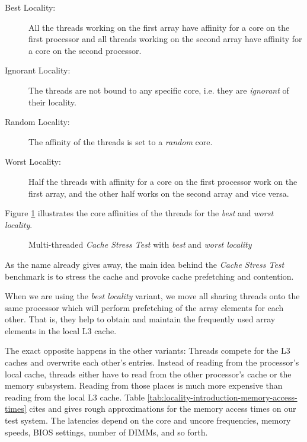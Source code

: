 \begin{description}
\item[Best Locality:] All the threads working on the first array have
  affinity for a core on the first processor and all threads working
  on the second array have affinity for a core on the second
  processor.
\item[Ignorant Locality:] The threads are not bound to any specific
  core, i.e. they are \emph{ignorant} of their locality.
\item[Random Locality:] The affinity of the threads is set to a
  \emph{random} core.
\item[Worst Locality:] Half the threads with affinity for a core on
  the first processor work on the first array, and the other half
  works on the second array and vice versa.
\end{description}

Figure \ref{fig:locality-approach-cache-stress-test-mafushi}
illustrates the core affinities of the threads for the \emph{best} and
\emph{worst locality}.

\begin{figure}[!ht]
  \centering
  \caption{Multi-threaded \emph{Cache Stress Test} with \emph{best}
    and \emph{worst locality}}
  \label{fig:locality-approach-cache-stress-test-mafushi}
\end{figure}

As the name already gives away, the main idea behind the \emph{Cache
  Stress Test} benchmark is to stress the cache and provoke cache
prefetching and contention.

When we are using the \emph{best locality} variant, we move all
sharing threads onto the same processor which will perform prefetching
of the array elements for each other. That is, they help to obtain and
maintain the frequently used array elements in the local L3 cache.

The exact opposite happens in the other variants: Threads compete for
the L3 caches and overwrite each other's entries. Instead of reading
from the processor's local cache, threads either have to read from the
other processor's cache or the memory subsystem. Reading from those
places is much more expensive than reading from the local L3
cache. Table \ref{tab:locality-introduction-memory-access-times} cites
\textcite{Levinthal2009} and gives rough approximations for the memory
access times on our test system. The latencies depend on the core and
uncore frequencies, memory speeds, BIOS settings, number of DIMMs, and
so forth.

